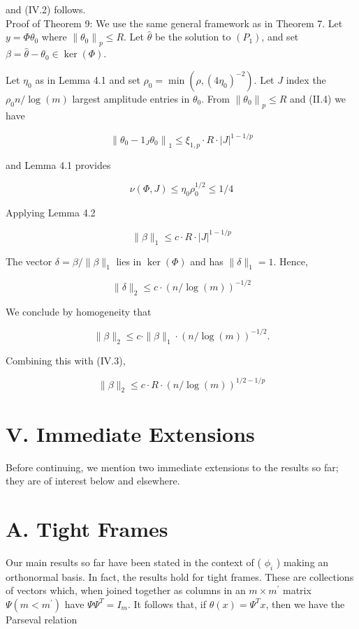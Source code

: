 \documentclass[10pt]{article}
\begin{document}
and (IV.2) follows.\\
Proof of Theorem 9: We use the same general framework as in Theorem 7. Let $y=\Phi \theta_{0}$ where $\left\|\theta_{0}\right\|_{p} \leq R$. Let $\hat{\theta}$ be the solution to $\left(P_{1}\right)$, and set $\beta=\hat{\theta}-\theta_{0} \in \operatorname{ker}(\Phi)$.

Let $\eta_{0}$ as in Lemma 4.1 and set $\rho_{0}=\min \left(\rho,\left(4 \eta_{0}\right)^{-2}\right)$. Let $J$ index the $\rho_{0} n / \log (m)$ largest amplitude entries in $\theta_{0}$. From $\left\|\theta_{0}\right\|_{p} \leq R$ and (II.4) we have

$$
\left\|\theta_{0}-1_{J} \theta_{0}\right\|_{1} \leq \xi_{1, p} \cdot R \cdot|J|^{1-1 / p}
$$

and Lemma 4.1 provides

$$
\nu(\Phi, J) \leq \eta_{0} \rho_{0}^{1 / 2} \leq 1 / 4
$$

Applying Lemma 4.2


\begin{equation*}
\|\beta\|_{1} \leq c \cdot R \cdot|J|^{1-1 / p} \tag{IV.3}
\end{equation*}


The vector $\delta=\beta /\|\beta\|_{1}$ lies in $\operatorname{ker}(\Phi)$ and has $\|\delta\|_{1}=1$. Hence,

$$
\|\delta\|_{2} \leq c \cdot(n / \log (m))^{-1 / 2}
$$

We conclude by homogeneity that

$$
\|\beta\|_{2} \leq c \cdot\|\beta\|_{1} \cdot(n / \log (m))^{-1 / 2} .
$$

Combining this with (IV.3),

$$
\|\beta\|_{2} \leq c \cdot R \cdot(n / \log (m))^{1 / 2-1 / p}
$$

\section*{V. Immediate Extensions}
Before continuing, we mention two immediate extensions to the results so far; they are of interest below and elsewhere.

\section*{A. Tight Frames}
Our main results so far have been stated in the context of ( $\phi_{i}$ ) making an orthonormal basis. In fact, the results hold for tight frames. These are collections of vectors which, when joined together as columns in an $m \times m^{\prime}$ matrix $\Psi\left(m<m^{\prime}\right)$ have $\Psi \Psi^{T}=I_{m}$. It follows that, if $\theta(x)=\Psi^{T} x$, then we have the Parseval relation
\end{document}
